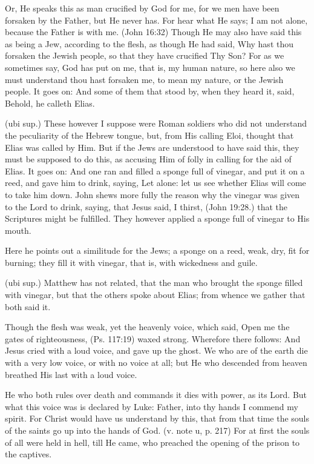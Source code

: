  Or, He speaks this as man crucified by God for me, for we men have been forsaken by the Father, but He never has. For hear what He says; I am not alone, because the Father is with me. (John 16:32) Though He may also have said this as being a Jew, according to the flesh, as though He had said, Why hast thou forsaken the Jewish people, so that they have crucified Thy Son? For as we sometimes say, God has put on me, that is, my human nature, so here also we must understand thou hast forsaken me, to mean my nature, or the Jewish people. It goes on: And some of them that stood by, when they heard it, said, Behold, he calleth Elias.

 (ubi sup.) These however I suppose were Roman soldiers who did not understand the peculiarity of the Hebrew tongue, but, from His calling Eloi, thought that Elias was called by Him. But if the Jews are understood to have said this, they must be supposed to do this, as accusing Him of folly in calling for the aid of Elias. It goes on: And one ran and filled a sponge full of vinegar, and put it on a reed, and gave him to drink, saying, Let alone: let us see whether Elias will come to take him down. John shews more fully the reason why the vinegar was given to the Lord to drink, saying, that Jesus said, I thirst, (John 19:28.) that the Scriptures might be fulfilled. They however applied a sponge full of vinegar to His mouth.

 Here he points out a similitude for the Jews; a sponge on a reed, weak, dry, fit for burning; they fill it with vinegar, that is, with wickedness and guile.

 (ubi sup.) Matthew has not related, that the man who brought the sponge filled with vinegar, but that the others spoke about Elias; from whence we gather that both said it.

 Though the flesh was weak, yet the heavenly voice, which said, Open me the gates of righteousness, (Ps. 117:19) waxed strong. Wherefore there follows: And Jesus cried with a loud voice, and gave up the ghost. We who are of the earth die with a very low voice, or with no voice at all; but He who descended from heaven breathed His last with a loud voice.

 He who both rules over death and commands it dies with power, as its Lord. But what this voice was is declared by Luke: Father, into thy hands I commend my spirit. For Christ would have us understand by this, that from that time the souls of the saints go up into the hands of God. (v. note u, p. 217) For at first the souls of all were held in hell, till He came, who preached the opening of the prison to the captives.

